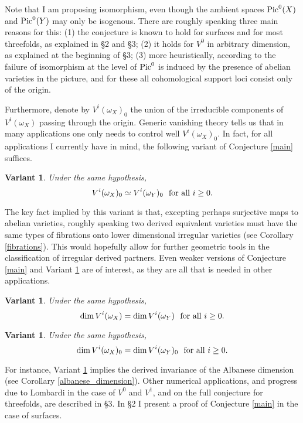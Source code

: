 \documentclass{amsart}
\theoremstyle{plain}
\newtheorem{variant}[theorem]{Variant}
\theoremstyle{definition}
\numberwithin{equation}{section}
\begin{document}
Note that I am proposing isomorphism, even though the ambient spaces ${\rm Pic}^0 (X)$ and ${\rm Pic}^0 (Y)$ may only be isogenous.
There are roughly speaking three main reasons for this: (1) the conjecture is known to hold for surfaces and for most threefolds, 
as explained in \S2 and \S3; (2) it holds for $V^0$ in arbitrary dimension, as explained at the beginning of \S3; (3) more heuristically, 
according to \cite{PS} the failure of isomorphism at the level of ${\rm Pic}^0$ is induced by the presence of abelian varieties in the picture, 
and for these all cohomological support loci consist only of the origin.

Furthermore, denote by $V^i( \omega_X)_0$ the union of the 
irreducible components of $V^i (\omega_X)$  passing through the origin. Generic vanishing theory tells 
us that in many applications one only needs to control well $V^i (\omega_X)_0$. 
In fact, for all applications I currently have in mind, the following variant of Conjecture \ref{main} suffices.

\begin{variant}\label{var1}
Under the same hypothesis, 
$$V^i (\omega_X)_0  \simeq V^i (\omega_Y)_0 \,\,\,\, {\rm for ~all~} i \ge 0.$$ 
\end{variant}

The key fact implied by this variant is that, excepting perhaps surjective maps to abelian varieties, 
roughly speaking two derived equivalent varieties must have the same types of fibrations onto 
lower dimensional irregular varieties (see Corollary \ref{fibrations}). This would hopefully allow for 
further geometric tools in the classification of irregular derived partners.
Even weaker versions of Conjecture \ref{main} and Variant \ref{var1} are of interest, as they are all that is needed in other applications. 

\begin{variant}\label{var2}
Under the same hypothesis, 
$$\dim V^i (\omega_X)  = \dim V^i (\omega_Y) \,\,\,\, {\rm for ~all~} i \ge 0.$$ 
\end{variant}

\begin{variant}\label{var3}
Under the same hypothesis, 
$$\dim V^i (\omega_X)_0  = \dim V^i (\omega_Y)_0 \,\,\,\, {\rm for ~all~} i \ge 0.$$ 
\end{variant}

For instance, Variant \ref{var3} implies the derived invariance of the Albanese dimension (see Corollary \ref{albanese_dimension}). Other numerical applications, and progress due to Lombardi \cite{lombardi} in the case of $V^0$ and $V^1$, and on the full conjecture for threefolds, are described in \S3. In \S2 I present a proof of Conjecture \ref{main} in the case of surfaces. 
\end{document}
